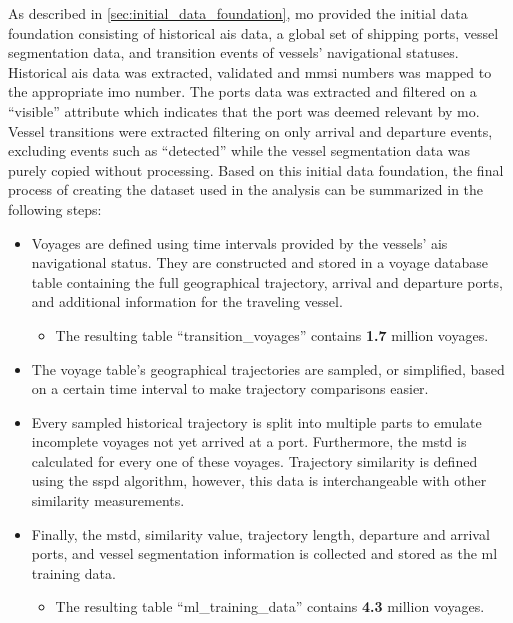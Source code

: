 As described in \cref{sec:initial_data_foundation}, \acrfull{mo} provided the initial data foundation consisting of historical \acrshort{ais} data, a global set of shipping ports, vessel segmentation data, and transition events of vessels' navigational statuses. Historical \acrshort{ais} data was extracted, validated and \acrshort{mmsi} numbers was mapped to the appropriate \acrshort{imo} number. The ports data was extracted and filtered on a ``visible'' attribute which indicates that the port was deemed relevant by \acrshort{mo}. Vessel transitions were extracted filtering on only arrival and departure events, excluding events such as ``detected'' while the vessel segmentation data was purely copied without processing. Based on this initial data foundation, the final process of creating the dataset used in the analysis can be summarized in the following steps:

\begin{itemize}
    \item Voyages are defined using time intervals provided by the vessels' \acrshort{ais} navigational status. They are constructed and stored in a voyage database table containing the full geographical trajectory, arrival and departure ports, and additional information for the traveling vessel.
    \begin{itemize}
        \item The resulting table ``transition\_voyages'' contains \textbf{1.7} million voyages.
    \end{itemize}
    \item The voyage table's geographical trajectories are sampled, or simplified, based on a certain time interval to make trajectory comparisons easier.
    \item Every sampled historical trajectory is split into multiple parts to emulate incomplete voyages not yet arrived at a port. Furthermore, the \acrshort{mstd} is calculated for every one of these voyages. Trajectory similarity is defined using the \acrshort{sspd} algorithm, however, this data is interchangeable with other similarity measurements.
    \item Finally, the \acrshort{mstd}, similarity value, trajectory length, departure and arrival ports, and vessel segmentation information is collected and stored as the \acrshort{ml} training data.
    \begin{itemize}
        \item The resulting table ``ml\_training\_data'' contains \textbf{4.3} million voyages.
    \end{itemize}
\end{itemize}

